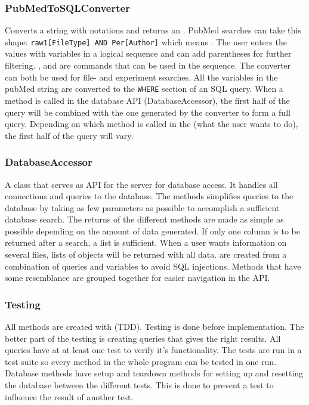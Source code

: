 \subsubsection{PubMedToSQLConverter}
Converts a string with  notations and returns an . PubMed searches can take this shape: \texttt{raw1[FileType] AND Per[Author]} which means . The user enters the values with variables in a logical sequence and can add parentheses for further filtering. ,  and  are commands that can be used in the sequence. The converter can both be used for file- and experiment searches. All the variables in the pubMed string are converted to the \texttt{WHERE} section of an SQL query. When a method is called in the database API (DatabaseAccessor), the first half of the query will be combined with the one generated by the converter to form a full query. Depending on which method is called in the  (what the user wants to do), the first half of the query will vary.

\subsubsection{DatabaseAccessor}
A class that serves as API for the server for database access. It handles all connections and queries to the database. The methods simplifies queries to the database by taking as few parameters as possible to accomplish a sufficient database search. The returns of the different methods are made as simple as possible depending on the amount of data generated. If only one column is to be returned after a search, a list is sufficient. When a user wants information on several files, lists of objects will be returned with all data.  are created from a combination of queries and variables to avoid SQL injections. Methods that have some resemblance are grouped together for easier navigation in the API.

\subsubsection{Testing}
All methods are created with  (TDD). Testing is done before implementation. The better part of the testing is creating queries that gives the right results. All queries have at at least one test to verify it's functionality. The tests are run in a test suite so every method in the whole program can be tested in one run. Database methods have setup and teardown methods for setting up and resetting the database between the different tests. This is done to prevent a test to influence the result of another test.
